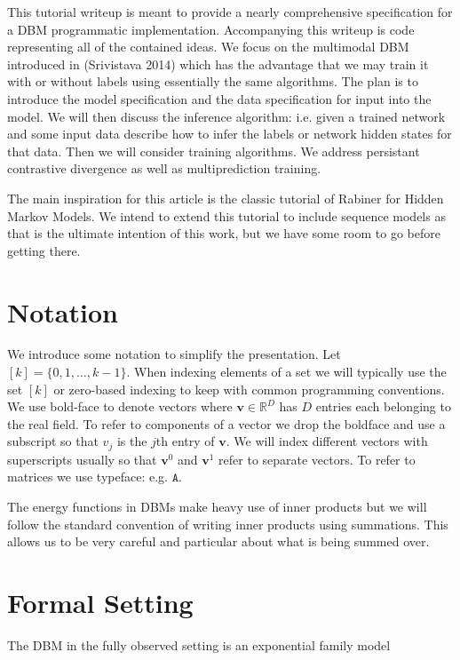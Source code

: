 \documentclass{article} %
\begin{document}
This tutorial writeup is meant to provide a nearly comprehensive
specification for a DBM programmatic implementation.  Accompanying this writeup is code representing
all of the contained ideas. We focus on the
multimodal DBM introduced in (Srivistava 2014) which has the advantage
that we may train it with or without labels using essentially the same
algorithms. The plan is to introduce the model specification and the
data specification for input into the model.  We will then discuss the
inference algorithm: i.e. given a trained network and some input data
describe how to infer the labels or network hidden states for that
data.  Then we will consider training algorithms.  We address
persistant contrastive divergence as well as multiprediction training.

The main inspiration for this article is the classic tutorial of Rabiner for Hidden Markov Models.  We intend to extend this tutorial to
include sequence models as that is the ultimate intention of this work, but we have some room to go before getting there.

\section{Notation}

We introduce some notation to simplify the presentation. Let $[k]=\{0,1,\ldots,k-1\}$.  When indexing elements of a set we will
typically use the set $[k]$ or zero-based indexing to keep with common programming conventions.
We use bold-face to denote vectors
where $\mathbf{v}\in\mathbb{R}^D$ has $D$ entries each belonging to the real field.  To refer to components of a vector 
we drop the boldface and use a subscript so that $v_j$ is the $j$th entry of $\mathbf{v}$.  We will index different vectors
with superscripts usually so that $\mathbf{v}^0$ and $\mathbf{v}^1$ refer to separate vectors. To refer to matrices we use typeface:
e.g. $\mathtt{A}$. 

The energy functions in DBMs make heavy use of inner products but we will follow the standard convention of writing inner products
using summations.  This allows us to be very careful and particular about what is being summed over.

\section{Formal Setting}

The DBM in the fully observed setting is an exponential family model
\end{document}
